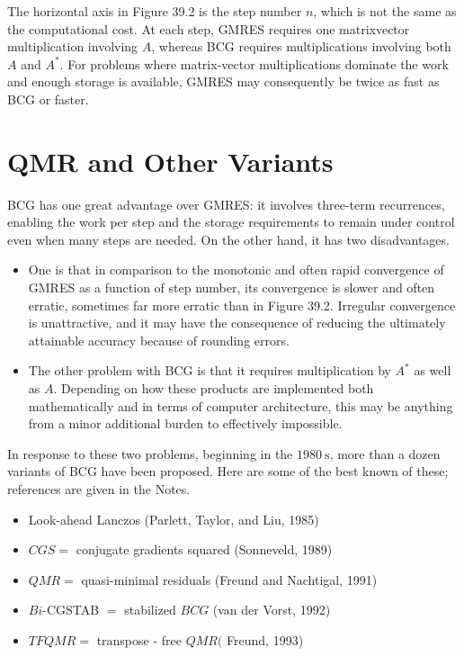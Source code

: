 The horizontal axis in Figure 39.2 is the step number $n$, which is not the same as the computational cost. At each step, GMRES requires one matrixvector multiplication involving $A$, whereas BCG requires multiplications involving both $A$ and $A^*$. For problems where matrix-vector multiplications dominate the work and enough storage is available, GMRES may consequently be twice as fast as BCG or faster. 


\section{QMR and Other Variants} 
 
BCG has one great advantage over GMRES: it involves three-term recurrences, enabling the work per step and the storage requirements to remain under control even when many steps are needed. On the other hand, it has two disadvantages.
\begin{itemize}
    \item One is that in comparison to the monotonic and often rapid convergence of GMRES as a function of step number, its convergence is slower and often erratic, sometimes far more erratic than in Figure 39.2. Irregular convergence is unattractive, and it may have the consequence of reducing the ultimately attainable accuracy because of rounding errors. 
    \item The other problem with BCG is that it requires multiplication by $A^*$ as well as $A$. Depending on how these products are implemented both mathematically and in terms of computer architecture, this may be anything from a minor additional burden to effectively impossible.
\end{itemize}

In response to these two problems, beginning in the $1980 \mathrm{~s}$, more than a dozen variants of BCG have been proposed. Here are some of the best known of these; references are given in the Notes.
\begin{itemize}
    \item Look-ahead Lanczos (Parlett, Taylor, and Liu, 1985)
    \item $C G S=$ conjugate gradients squared (Sonneveld, 1989)
    \item $Q M R=$ quasi-minimal residuals (Freund and Nachtigal, 1991)
    \item $B i$-CGSTAB $=$ stabilized $B C G$ (van der Vorst, 1992)
    \item $T F Q M R=$ transpose - free $Q M R($ Freund, 1993)
\end{itemize}

